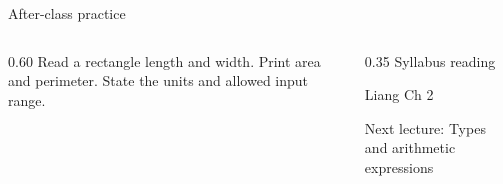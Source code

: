 \documentclass[10pt,aspectratio=169]{beamer}
\begin{document}
\begin{frame}[fragile,t]{After-class practice}
\begin{columns}[T,onlytextwidth]\begin{column}{0.60\textwidth}
Read a rectangle length and width. Print area and perimeter. State the units and allowed input range.
\end{column}\begin{column}{0.35\textwidth}\small
Syllabus reading\par Liang Ch 2

Next lecture: Types and arithmetic expressions
\end{column}\end{columns}
\end{frame}
\end{document}
